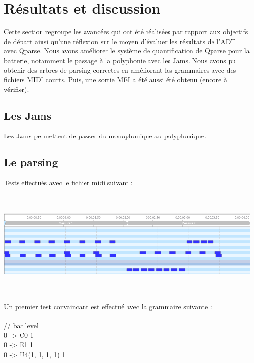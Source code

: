 \section{Résultats et discussion}
Cette section regroupe les avancées qui ont été réalisées par rapport aux objectifs de départ ainsi qu’une réflexion sur le moyen d’évaluer les résultats de l’ADT avec Qparse. Nous avons améliorer le système de quantification de Qparse pour la batterie, notamment le passage à la polyphonie avec les Jams. Nous avons pu obtenir des arbres de parsing correctes en améliorant les grammaires avec des fichiers MIDI courts. Puis, une sortie MEI a été aussi été obtenu (encore à vérifier).
\subsection*{Les Jams}
Les Jams permettent de passer du monophonique au polyphonique.
\label{jam_tests}
\subsection*{Le parsing}
\label{gram_pond}
Tests effectués avec le fichier midi suivant :\\\\
\includegraphics[height=50mm, width=160mm]{z_images/4_experimentations/3_developpement/0_midi_2bars_fill.png}\\\\
Un premier test convaincant est effectué avec la grammaire suivante :\\\\
// bar level\\
0 -> C0                1\\
0 -> E1                1\\
0 -> U4(1, 1, 1, 1)    1\\

